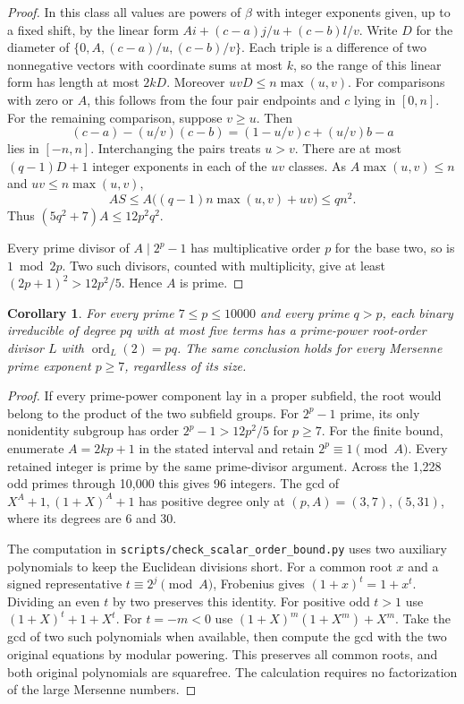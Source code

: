 \documentclass[11pt]{article}
\newtheorem{corollary}[theorem]{Corollary}
\newcommand{\ord}{\operatorname{ord}}
\begin{document}
\begin{proof}
In this class all values are powers of \(\beta\) with integer exponents
given, up to a fixed shift, by the linear form
\(Ai+(c-a)j/u+(c-b)l/v\). Write \(D\) for the diameter of
\(\{0,A,(c-a)/u,(c-b)/v\}\). Each triple is a difference of two
nonnegative vectors with coordinate sums at most \(k\), so the range
of this linear form has length at most \(2kD\).
Moreover \(uvD\le n\max(u,v)\).
For comparisons with zero or \(A\), this follows from the four pair
endpoints and \(c\) lying in \([0,n]\). For the remaining comparison,
suppose \(v\ge u\). Then
\[
 (c-a)-(u/v)(c-b)=(1-u/v)c+(u/v)b-a
\]
lies in \([-n,n]\). Interchanging the pairs treats \(u>v\).
There are at most \((q-1)D+1\) integer exponents in each of the
\(uv\) classes. As \(A\max(u,v)\le n\) and \(uv\le n\max(u,v)\),
\[
        AS\le A\big((q-1)n\max(u,v)+uv\big)\le qn^2 .
\]
Thus \((5q^2+7)A\le12p^2q^2\).

Every prime divisor of \(A\mid2^p-1\) has multiplicative order \(p\)
for the base two, so is \(1\bmod 2p\). Two such divisors, counted with
multiplicity, give at least \((2p+1)^2>12p^2/5\). Hence \(A\) is prime.
\end{proof}

\begin{corollary}\label{cor:scalar-10000}
For every prime \(7\le p\le10000\) and \emph{every} prime \(q>p\), each
binary irreducible of degree \(pq\) with at most five terms has a
prime-power root-order divisor \(L\) with \(\ord_L(2)=pq\).
The same conclusion holds for every Mersenne prime exponent \(p\ge7\),
regardless of its size.
\end{corollary}
\begin{proof}
If every prime-power component lay in a proper subfield, the root
would belong to the product of the two subfield groups.
For \(2^p-1\) prime, its only nonidentity subgroup has order
\(2^p-1>12p^2/5\) for \(p\ge7\).
For the finite bound, enumerate \(A=2kp+1\) in the stated interval
and retain \(2^p\equiv1\pmod A\). Every retained integer is prime by
the same prime-divisor argument. Across the 1,228 odd primes through
10,000 this gives 96 integers. The gcd of \(X^A+1,(1+X)^A+1\)
has positive degree only at \((p,A)=(3,7),(5,31)\), where its degrees
are 6 and 30.

The computation in \nolinkurl{scripts/check_scalar_order_bound.py}
uses two auxiliary polynomials to keep the Euclidean divisions short.
For a common root \(x\) and a signed representative
\(t\equiv2^j\pmod A\), Frobenius gives \((1+x)^t=1+x^t\).
Dividing an even \(t\) by two preserves this identity. For positive
odd \(t>1\) use \((1+X)^t+1+X^t\). For \(t=-m<0\) use
\((1+X)^m(1+X^m)+X^m\). Take the gcd of two such polynomials when
available, then compute the gcd with the two original equations by
modular powering. This preserves all common roots, and both original
polynomials are squarefree. The calculation requires no factorization
of the large Mersenne numbers.
\end{proof}
\end{document}
